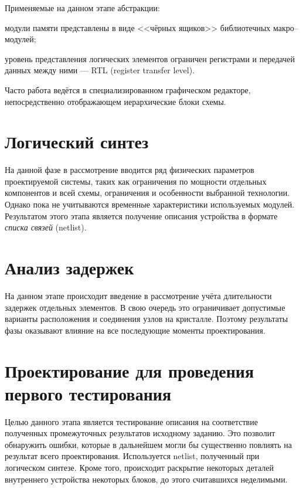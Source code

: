 Применяемые на данном этапе абстракции:
\begin{itemize*}
    \item модули памяти представлены в виде <<чёрных ящиков>> библиотечных макро--модулей;
    \item уровень представления логических элементов ограничен регистрами и передачей данных между ними — RTL (\abbr register transfer level).
\end{itemize*}

Часто работа ведётся в специализированном графическом редакторе, непосредственно отображающем иерархические блоки схемы.

\section{Логический синтез}\label{logicsynthesis}

На данной фазе в рассмотрение вводится ряд физических параметров проектируемой системы, таких как ограничения по мощности отдельных компонентов и всей схемы, ограничения и особенности выбранной технологии. Однако пока не учитываются временн\textit{ы}е характеристики используемых модулей. Результатом этого этапа является получение описания устройства в формате \textit{списка связей} (\abbr netlist).

\section{Анализ задержек}

На данном этапе происходит введение в рассмотрение учёта длительности задержек отдельных элементов. В свою очередь это ограничивает допустимые варианты расположения и соединения узлов на кристалле. Поэтому результаты фазы оказывают влияние на все последующие моменты проектирования.

\section{Проектирование для проведения первого тестирования}

Целью данного этапа является тестирование описания на соответствие полученных промежуточных результатов исходному заданию. Это позволит обнаружить ошибки, которые в дальнейшем могли бы существенно повлиять на результат всего проектирования. Используется netlist, полученный при логическом синтезе. Кроме того, происходит раскрытие некоторых деталей внутреннего устройства некоторых блоков, до этого считавшихся неделимыми.

